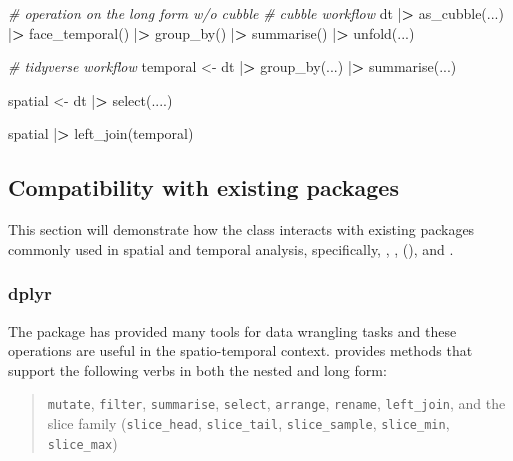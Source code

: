 \documentclass{article}
\newenvironment{Shaded}{\begin{snugshade}}{\end{snugshade}}
\newcommand{\CommentTok}[1]{\textcolor[rgb]{0.56,0.35,0.01}{\textit{#1}}}
\newcommand{\ErrorTok}[1]{\textcolor[rgb]{0.64,0.00,0.00}{\textbf{#1}}}
\newcommand{\FunctionTok}[1]{\textcolor[rgb]{0.00,0.00,0.00}{#1}}
\newcommand{\NormalTok}[1]{#1}
\newcommand{\OtherTok}[1]{\textcolor[rgb]{0.56,0.35,0.01}{#1}}
\newcommand{\SpecialCharTok}[1]{\textcolor[rgb]{0.00,0.00,0.00}{#1}}
\begin{document}
\begin{Shaded}
\begin{Highlighting}[]
\CommentTok{\# operation on the long form w/o cubble}
\CommentTok{\# cubble workflow}
\NormalTok{dt }\SpecialCharTok{|}\ErrorTok{\textgreater{}}
  \FunctionTok{as\_cubble}\NormalTok{(...) }\SpecialCharTok{|}\ErrorTok{\textgreater{}}
  \FunctionTok{face\_temporal}\NormalTok{() }\SpecialCharTok{|}\ErrorTok{\textgreater{}}
  \FunctionTok{group\_by}\NormalTok{() }\SpecialCharTok{|}\ErrorTok{\textgreater{}}
  \FunctionTok{summarise}\NormalTok{() }\SpecialCharTok{|}\ErrorTok{\textgreater{}}
  \FunctionTok{unfold}\NormalTok{(...)}

\CommentTok{\# tidyverse workflow}
\NormalTok{temporal }\OtherTok{\textless{}{-}}\NormalTok{ dt }\SpecialCharTok{|}\ErrorTok{\textgreater{}}
  \FunctionTok{group\_by}\NormalTok{(...) }\SpecialCharTok{|}\ErrorTok{\textgreater{}}
  \FunctionTok{summarise}\NormalTok{(...)}

\NormalTok{spatial }\OtherTok{\textless{}{-}}\NormalTok{ dt }\SpecialCharTok{|}\ErrorTok{\textgreater{}} \FunctionTok{select}\NormalTok{(....)}

\NormalTok{spatial }\SpecialCharTok{|}\ErrorTok{\textgreater{}} \FunctionTok{left\_join}\NormalTok{(temporal)}
\end{Highlighting}
\end{Shaded}

\hypertarget{compact}{%
\subsection{Compatibility with existing packages}\label{compact}}

This section will demonstrate how the  class interacts with existing packages commonly used in spatial and temporal analysis, specifically, , ,  (), and .

\hypertarget{dplyr}{%
\subsubsection{dplyr}\label{dplyr}}

The  package has provided many tools for data wrangling tasks and these operations are useful in the spatio-temporal context.  provides methods that support the following  verbs in both the nested and long form:

\begin{quote}
\texttt{mutate}, \texttt{filter}, \texttt{summarise}, \texttt{select}, \texttt{arrange}, \texttt{rename}, \texttt{left\_join}, and the slice family (\texttt{slice\_head}, \texttt{slice\_tail}, \texttt{slice\_sample}, \texttt{slice\_min}, \texttt{slice\_max})
\end{quote}
\end{document}

